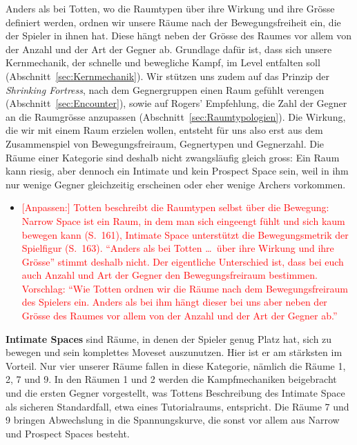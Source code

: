 \documentclass[../Main.tex]{subfiles}
\begin{document}
Anders als bei Totten, wo die Raumtypen über ihre Wirkung und ihre Grösse definiert werden, ordnen wir unsere Räume nach der Bewegungsfreiheit ein, die der Spieler in ihnen hat. Diese hängt neben der Grösse des Raumes vor allem von der Anzahl und der Art der Gegner ab. Grundlage dafür ist, dass sich unsere Kernmechanik, der schnelle und bewegliche Kampf, im Level entfalten soll (Abschnitt~\ref{sec:Kernmechanik}). Wir stützen uns zudem auf das Prinzip der \textit{Shrinking Fortress}, nach dem Gegnergruppen einen Raum gefühlt verengen (Abschnitt~\ref{sec:Encounter}), sowie auf Rogers' Empfehlung, die Zahl der Gegner an die Raumgrösse anzupassen (Abschnitt~\ref{sec:Raumtypologien}). Die Wirkung, die wir mit einem Raum erzielen wollen, entsteht für uns also erst aus dem Zusammenspiel von Bewegungsfreiraum, Gegnertypen und Gegnerzahl. Die Räume einer Kategorie sind deshalb nicht zwangsläufig gleich gross: Ein Raum kann riesig, aber dennoch ein Intimate und kein Prospect Space sein, weil in ihm nur wenige Gegner gleichzeitig erscheinen oder eher wenige Archers vorkommen.

\begin{itemize}[leftmargin=1.5cm]
    \item \textcolor{red}{[Anpassen:] Totten beschreibt die Raumtypen selbst über die Bewegung: Narrow Space ist ein Raum, in dem man sich eingeengt fühlt und sich kaum bewegen kann (S.~161), Intimate Space unterstützt die Bewegungsmetrik der Spielfigur (S.~163). \enquote{Anders als bei Totten \ldots\ über ihre Wirkung und ihre Grösse} stimmt deshalb nicht. Der eigentliche Unterschied ist, dass bei euch auch Anzahl und Art der Gegner den Bewegungsfreiraum bestimmen. Vorschlag: \enquote{Wie Totten ordnen wir die Räume nach dem Bewegungsfreiraum des Spielers ein. Anders als bei ihm hängt dieser bei uns aber neben der Grösse des Raumes vor allem von der Anzahl und der Art der Gegner ab.}}
\end{itemize}

\textbf{Intimate Spaces} sind Räume, in denen der Spieler genug Platz hat, sich zu bewegen und sein komplettes Moveset auszunutzen. Hier ist er am stärksten im Vorteil. Nur vier unserer Räume fallen in diese Kategorie, nämlich die Räume 1, 2, 7 und 9. In den Räumen 1 und 2 werden die Kampfmechaniken beigebracht und die ersten Gegner vorgestellt, was Tottens Beschreibung des Intimate Space als sicheren Standardfall, etwa eines Tutorialraums, entspricht. Die Räume 7 und 9 bringen Abwechslung in die Spannungskurve, die sonst vor allem aus Narrow und Prospect Spaces besteht.
\end{document}
